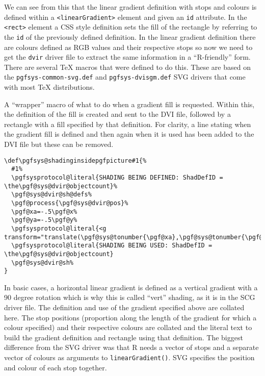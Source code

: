 \documentclass[]{article}
\begin{document}
We can see from this that the linear gradient definition with stops and
colours is defined within a
\texttt{\textless{}linearGradient\textgreater{}} element and given an
\texttt{id} attribute. In the \texttt{\textless{}rect\textgreater{}}
element a CSS style definition sets the fill of the rectangle by
referring to the \texttt{id} of the previously defined definition. In
the linear gradient definition there are colours defined as RGB values
and their respective stops so now we need to get the \texttt{dvir}
driver file to extract the same information in a ``R-friendly'' form.
There are several \TeX{} macros that were defined to do this. These are
based on the \texttt{pgfsys-common-svg.def} and
\texttt{pgfsys-dvisgm.def} SVG drivers that come with most \TeX{}
distributions.

A ``wrapper'' macro of what to do when a gradient fill is requested.
Within this, the definition of the fill is created and sent to the DVI
file, followed by a rectangle with a fill specified by that definition.
For clarity, a line stating when the gradient fill is defined and then
again when it is used has been added to the DVI file but these can be
removed.

\begin{verbatim}
\def\pgfsys@shadinginsidepgfpicture#1{%
  #1%
  \pgfsysprotocol@literal{SHADING BEING DEFINED: ShadDefID = \the\pgf@sys@dvir@objectcount}%
  \pgf@sys@dvir@sh@defs% 
  \pgf@process{\pgf@sys@dvir@pos}%
  \pgf@xa=-.5\pgf@x%
  \pgf@ya=-.5\pgf@y%
  \pgfsysprotocol@literal{<g transform="translate(\pgf@sys@tonumber{\pgf@xa},\pgf@sys@tonumber{\pgf@ya})">}%
  \pgfsysprotocol@literal{SHADING BEING USED: ShadDefID = \the\pgf@sys@dvir@objectcount}
  \pgf@sys@dvir@sh%
}
\end{verbatim}

In basic cases, a horizontal linear gradient is defined as a vertical
gradient with a 90 degree rotation which is why this is called ``vert''
shading, as it is in the SCG driver file. The definition and use of the
gradient specified above are collated here. The stop positions
(proportion along the length of the gradient for which a colour
specified) and their respective colours are collated and the literal
text to build the gradient definition and rectangle using that
definition. The biggest difference from the SVG driver was that R needs
a vector of stops and a separate vector of colours as arguments to
\texttt{linearGradient()}. SVG specifies the position and colour of each
stop together.
\end{document}
